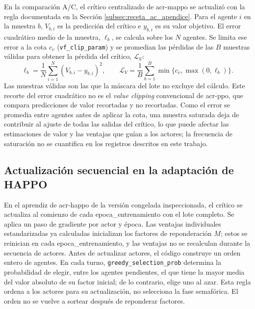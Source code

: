 En la comparación A/C, el crítico centralizado de \acrshort{acr-mappo} se actualizó con la regla documentada en la Sección \ref{subsec:receta_ac_apendice}. Para el agente $i$ en la muestra $b$, $V_{b,i}$ es la predicción del crítico e $y_{b,i}$ es su valor objetivo. El error cuadrático medio de la muestra, $\ell_b$, se calcula sobre los $N$ agentes. Se limita ese error a la cota $c_v$ (\texttt{vf\_\allowbreak clip\_\allowbreak param}) y se promedian las pérdidas de las $B$ muestras válidas para obtener la pérdida del crítico, $\mathcal{L}_V$:
\begin{equation}
 \ell_b=\frac{1}{N}\sum_{i=1}^{N}(V_{b,i}-y_{b,i})^2,
 \qquad
 \mathcal{L}_V=\frac{1}{B}\sum_{b=1}^{B}\min\{c_v,\max(0,\ell_b)\}.
 \label{eq:perdida_valor_marl_tlc}
\end{equation}
Las muestras válidas son las que la máscara del lote no excluye del cálculo. Este recorte del error cuadrático no es el \textit{value clipping} convencional de \acrshort{acr-ppo}, que compara predicciones de valor recortadas y no recortadas. Como el error se promedia entre agentes antes de aplicar la cota, una muestra saturada deja de contribuir al ajuste de todas las salidas del crítico, lo que puede afectar las estimaciones de valor y las ventajas que guían a los actores; la frecuencia de saturación no se cuantifica en los registros descritos en este trabajo.

\subsection{Actualización secuencial en la adaptación de HAPPO}
\label{subsec:actualizacion_happo_apendice}

En el aprendiz de \acrshort{acr-happo} de la versión congelada inspeccionada, el crítico se actualiza al comienzo de cada \gls{epoca_entrenamiento} con el lote completo. Se aplica un paso de gradiente por actor y época. Las ventajas individuales estandarizadas ya calculadas inicializan los factores de reponderación $M$; estos se reinician en cada \gls{epoca_entrenamiento}, y las ventajas no se recalculan durante la secuencia de actores. Antes de actualizar actores, el código construye un orden entero de agentes. En cada turno, \texttt{greedy\_selection\_prob} determina la probabilidad de elegir, entre los agentes pendientes, el que tiene la mayor media del valor absoluto de su factor inicial; de lo contrario, elige uno al azar. Esta regla ordena a los actores para su actualización, no selecciona la fase semafórica. El orden no se vuelve a sortear después de reponderar factores.

